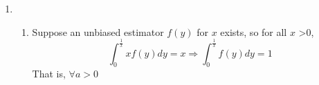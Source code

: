 \documentclass[a4paper]{article}
\begin{document}
\begin{enumerate}
\begin{proof}
          So 

          \begin{equation}
            1+b'(x) = \E\left[\hat{x}(y) \frac{\partial}{\partial x} \ln f(y;x) \right]
          \end{equation}

          And according to the regularity condition,

          \begin{equation}
            \E\left[\frac{\partial}{\partial x} \ln f(y;x)\right] = 0
          \end{equation}

          Thus,
          \begin{equation}
            1+b'(x) = \E\left[\left(\hat{x}(y)-\E[\hat{x}(y)]\right) \frac{\partial}{\partial x} \ln f(y;x) \right]
          \end{equation}

          Using the Cauchy-Schwarz inequality,

          \begin{equation}
            \begin{aligned}
              (1+b'(x))^2 & = \left(\E\left[\left(\hat{x}(y)-\E[\hat{x}(y)]\right) \frac{\partial}{\partial x} \ln f(y;x) \right]\right)^2 \\
              & \leqslant \E\left[\left(\hat{x}(y)-\E[\hat{x}(y)]\right)^2\right] \E\left[\left(\frac{\partial}{\partial x} \ln f(y;x)\right)^2\right]
            \end{aligned}
          \end{equation}

          that is,

          \begin{equation}
            \var(\hat{x}(y)) \geqslant \frac{[1+b'(x)]^2}{J_{\y}(x)}
          \end{equation}

      \end{proof}

        
  \item \begin{enumerate}
    \item Suppose an unbiased estimator $f(y)$ for $x$ exists, so for all $x$ >0,
    \begin{equation}
      \int_{0}^{\frac{1}{x}} xf(y)dy = x \Longrightarrow \int_{0}^{\frac{1}{x}} f(y)dy = 1
    \end{equation}
    That is, $\forall a >0 $


\end{enumerate}
\end{enumerate}
\end{document}

